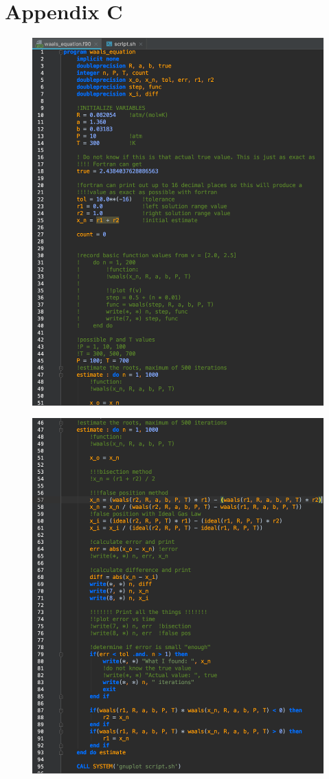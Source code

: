 \documentclass[12pt, letterpaper]{article}
\begin{document}
	\section{Appendix C}
		\begin{figure}[h]
			\centering
			\includegraphics[width=.864\linewidth]{fortrancode1.png}
		\end{figure}
		\begin{figure}[h]
			\centering
			\includegraphics[width=\linewidth]{fortrancode2.png}
		\end{figure}
\end{document}
